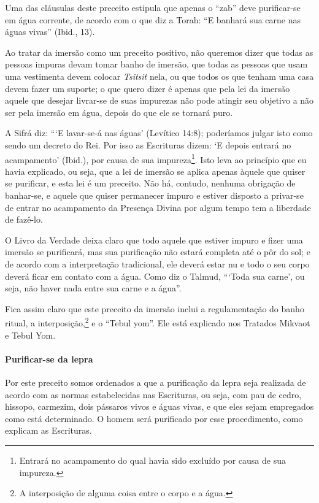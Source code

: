 Uma das cláusulas deste preceito estipula que apenas o ``zab'' deve
purificar-se em água corrente, de acordo com o que diz a Torah: ``E
banhará sua carne nas águas vivas'' (Ibid., 13).

Ao tratar da imersão como um preceito positivo, não queremos dizer que
todas as pessoas impuras devam tomar banho de imersão, que todas
as pessoas que usam uma vestimenta devem colocar \textit{Tsitsit} nela, ou
que todos os que tenham uma casa devem fazer um suporte; o que quero
dizer é apenas que pela lei da imersão aquele que desejar livrar-se de
suas impurezas não pode atingir seu objetivo a não ser pela imersão em
água, depois do que ele se tornará puro.

A Sifrá diz: ```E lavar-se-á nas águas' (Levítico 14:8); poderíamos
julgar isto como sendo um decreto do Rei. Por isso as Escrituras dizem:
`E depois entrará no acampamento' (Ibid.), por causa de sua
impureza\footnote{Entrará no acampamento do qual havia sido excluído por causa de sua
  impureza.}. Isto leva ao princípio que eu havia
explicado, ou seja, que a lei de imersão se aplica apenas àquele que
quiser se purificar, e esta lei é um preceito. Não há, contudo, nenhuma
obrigação de banhar-se, e aquele que quiser permanecer impuro e estiver
disposto a privar-se de entrar no acampamento da Presença Divina por
algum tempo tem a liberdade de fazê-lo.

O Livro da Verdade deixa claro que todo aquele que estiver impuro e
fizer uma imersão se purificará, mas sua purificação não estará completa
até o pôr do sol; e de acordo com a interpretação tradicional, ele
deverá estar nu e todo o seu corpo deverá ficar em contato com a água.
Como diz o Talmud, ```Toda sua carne', ou seja, não haver nada entre sua
carne e a água''.

Fica assim claro que este preceito da imersão inclui a regulamentação
do banho ritual, a interposição,\footnote{A interposição de alguma coisa entre o corpo e a água.} e o ``Tebul
yom''. Ele está explicado nos Tratados Mikvaot e Tebul Yom.

\paragraph{Purificar-se da lepra}

Por este preceito somos ordenados a que a purificação da lepra seja
realizada de acordo com as normas estabelecidas nas Escrituras, ou seja,
com pau de cedro, hissopo, carmezim, dois pássaros vivos e águas vivas,
e que eles sejam empregados como está determinado. O homem será
purificado por esse procedimento, como explicam as Escrituras.

